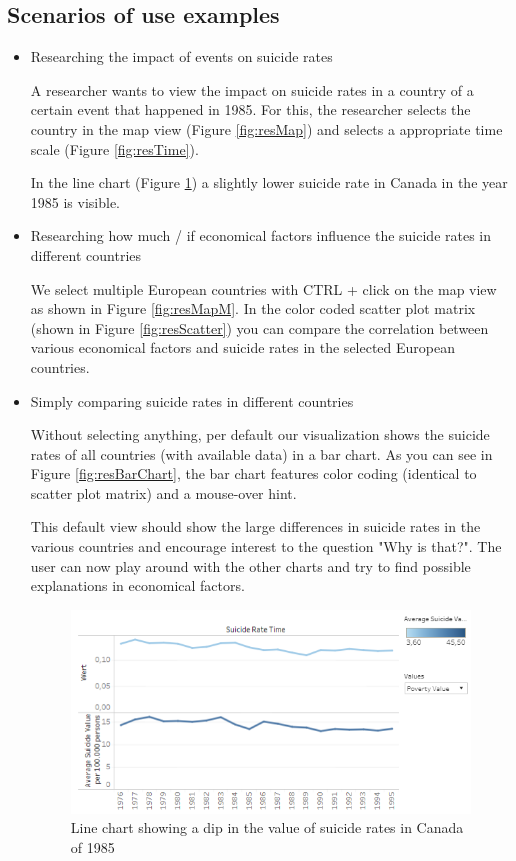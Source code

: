 \documentclass{vgtc}                          %
\begin{document}
\subsection{Scenarios of use examples}
\begin{itemize}
\item Researching the impact of events on suicide rates

A researcher wants to view the impact on suicide rates in a country of a certain event that happened in 1985. For this, the researcher selects the country in the map view (Figure \ref{fig:resMap}) and selects a appropriate time scale (Figure \ref{fig:resTime}).

In the line chart (Figure \ref{fig:resLine}) a slightly lower suicide rate in Canada in the year 1985 is visible.

\item Researching how much / if economical factors influence the suicide rates in different countries

We select multiple European countries with CTRL + click on the map view as shown in Figure \ref{fig:resMapM}. In the color coded scatter plot matrix (shown in Figure \ref{fig:resScatter}) you can compare the correlation between various economical factors and suicide rates in the selected European countries.

\item Simply comparing suicide rates in different countries

Without selecting anything, per default our visualization shows the suicide rates of all countries (with available data) in a bar chart. As you can see in Figure \ref{fig:resBarChart}, the bar chart features color coding (identical to scatter plot matrix) and a mouse-over hint.

This default view should show the large differences in suicide rates in the various countries and encourage interest to the question "Why is that?". The user can now play around with the other charts and try to find possible explanations in economical factors.

\begin{figure}[tb]
\centering
\includegraphics[width=\columnwidth]{image/chris/researcher01.png}
\caption{Line chart showing a dip in the value of suicide rates in Canada of 1985}
\label{fig:resLine} 
\end{figure}


\end{itemize}
\end{document}
